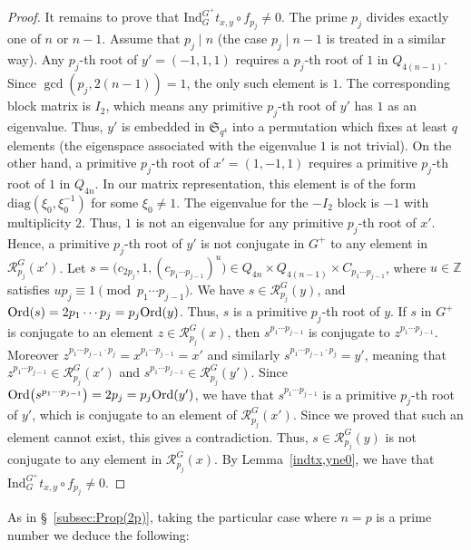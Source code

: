 \documentclass[12pt]{amsart}
\numberwithin{equation}{section}
\newcommand{\Ord}{{\rm Ord}}
\newcommand{\Z}{\mathbb Z}
\theoremstyle{definition}
\theoremstyle{remark}
\begin{document}
\begin{proof}
    It remains to prove that $\mathrm{Ind}_G^{G^+}t_{x,y}\circ f_{p_j}\ne 0$. The prime $p_j$ divides exactly one of $n$ or $n-1$. Assume that $p_j\mid n$ (the case $p_j\mid n-1$ is treated in a similar way). Any $p_j$-th root of $y'=(-1, 1,1)$ requires a $p_j$-th root of $1$ in $Q_{4(n-1)}$. Since $\gcd(p_j, 2(n-1))=1$, the only such element is $1$. The corresponding block matrix is $I_2$, which means any primitive $p_j$-th root of $y'$ has $1$ as an eigenvalue. Thus, $y'$ is embedded in $\mathfrak{S}_{q^4}$ into a permutation which fixes at least $q$ elements (the eigenspace associated with the eigenvalue $1$ is not trivial). On the other hand, a primitive $p_j$-th root of $x'=(1, -1, 1)$ requires a primitive $p_j$-th root of $1$ in $Q_{4n}$. In our matrix representation, this element is of the form $\mathrm{diag}(\xi_0, \xi_0^{-1})$ for some $\xi_0\ne 1$. The eigenvalue for the $-I_2$ block is $-1$ with multiplicity $2$. Thus, $1$ is not an eigenvalue for any primitive $p_j$-th root of $x'$. Hence, a primitive $p_j$-th root of $y'$ is not conjugate in $G^+$ to any element in $\mathcal{R}_{p_j}^G(x')$. Let $s=\bigl(c_{2p_j},1,(c_{p_1\cdots p_{j-1}})^u\bigr)\in Q_{4n}\times Q_{4(n-1)}\times C_{p_1\cdots p_{j-1}}$, where $u\in\Z$ satisfies $u p_j\equiv 1\pmod{ p_1\cdots p_{j-1}}$. We have $s\in \mathcal{R}_{p_j}^G(y)$, and $\Ord(s)=2p_1\cdots p_j=p_j \Ord(y)$. Thus, $s$ is a primitive $p_j$-th root of $y$. If $s$ in $G^+$ is conjugate to an element $z\in \mathcal{R}_{p_j}^G(x)$, then $s^{p_1\cdots p_{j-1}}$ is conjugate to $z^{p_1\cdots p_{j-1}}$. Moreover $z^{p_1\cdots p_{j-1} \cdot p_j}=x^{p_1\cdots p_{j-1}}=x'$ and similarly $s^{p_1\cdots p_{j-1}\cdot p_j}=y'$, meaning that $z^{p_1\cdots p_{j-1}}\in \mathcal{R}_{p_j}^G(x')$ and $s^{p_1\cdots p_{j-1}}\in \mathcal{R}_{p_j}^G(y')$. Since $\Ord\bigl(s^{p_1\cdots p_{j-1}}\bigr)=2p_j=p_j\Ord(y')$, we have that $s^{p_1\cdots p_{j-1}}$ is a primitive $p_j$-th root of $y'$, which is conjugate to an element of $\mathcal{R}_{p_j}^G(x')$. Since we proved that such an element cannot exist, this gives a contradiction. Thus, $s\in \mathcal{R}_{p_j}^G(y)$ is not conjugate to any element in $\mathcal{R}_{p_j}^G(x)$. By Lemma~\ref{indtx,yne0}, we have that $\mathrm{Ind}_G^{G^+}t_{x,y}\circ f_{p_j} \ne 0$.
\end{proof}

As in \S~\ref{subsec:Prop(2p)}, taking the particular case where $n=p$ is a prime number we deduce the following:
\end{document}
